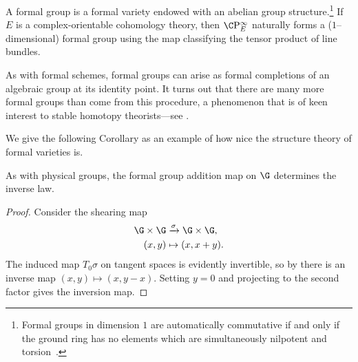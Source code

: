 \begin{definition}\label{DefnFormalGps}
A formal group is a formal variety endowed with an abelian group structure.\footnote{Formal groups in dimension $1$ are automatically commutative if and only if the ground ring has no elements which are simultaneously nilpotent and torsion~\cite[Theorem I.6.1]{Hazewinkel}.}  If $E$ is a complex-orientable cohomology theory, then $\CP^\infty_E$ naturally forms a ($1$--dimensional) formal group using the map classifying the tensor product of line bundles.
\end{definition}

\begin{remark}
As with formal schemes, formal groups can arise as formal completions of an algebraic group at its identity point.  It turns out that there are many more formal groups than come from this procedure, a phenomenon that is of keen interest to stable homotopy theorists---see .
\end{remark}

We give the following Corollary as an example of how nice the structure theory of formal varieties is.

\begin{corollary}
As with physical groups, the formal group addition map on $\G$ determines the inverse law.
\end{corollary}
\begin{proof}
Consider the shearing map
\begin{align*}
\G \times \G & \xrightarrow{\sigma} \G \times \G, \\
(x, y) & \mapsto (x, x + y).
\end{align*}
The induced map $T_0 \sigma$ on tangent spaces is evidently invertible, so by  there is an inverse map $(x, y) \mapsto (x, y - x)$.  Setting $y = 0$ and projecting to the second factor gives the inversion map.
\end{proof}




